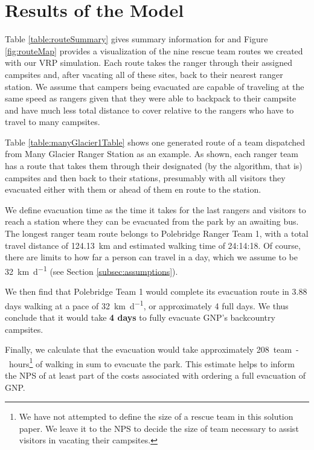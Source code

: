 \documentclass[12pt]{article}
\begin{document}
\section{Results of the Model}

Table \ref{table:routeSummary} gives summary information for and Figure \ref{fig:routeMap} provides a visualization of the nine rescue team routes we created with our VRP simulation. Each route takes the ranger through their assigned campsites and, after vacating all of these sites, back to their nearest ranger station. We assume that campers being evacuated are capable of traveling at the same speed as rangers given that they were able to backpack to their campsite and have much less total distance to cover relative to the rangers who have to travel to many campsites.

Table \ref{table:manyGlacier1Table} shows one generated route of a team dispatched from Many Glacier Ranger Station as an example. As shown, each ranger team has a route that takes them through their designated (by the algorithm, that is) campsites and then back to their stations, presumably with all visitors they evacuated either with them or ahead of them en route to the station. 

We define evacuation time as the time it takes for the last rangers and visitors to reach a station where they can be evacuated from the park by an awaiting bus. The longest ranger team route belongs to Polebridge Ranger Team 1, with a total travel distance of \SI{124.13}{\kilo\meter} and estimated walking time of 24:14:18. Of course, there are limits to how far a person can travel in a day, which we assume to be \SI{32}{\kilo\meter\per\day} (see Section \ref{subsec:assumptions}).

We then find that Polebridge Team 1 would complete its evacuation route in 3.88 days walking at a pace of \SI{32}{\kilo\meter\per\day}, or approximately 4 full days. We thus conclude that it would take \textbf{4 days} to fully evacuate GNP's backcountry campsites.

Finally, we calculate that the evacuation would take approximately \SI{208}{team-hours}\footnote{We have not attempted to define the size of a rescue team in this solution paper. We leave it to the NPS to decide the size of team necessary to assist visitors in vacating their campsites.} of walking in sum to evacuate the park. This estimate helps to inform the NPS of at least part of the costs associated with ordering a full evacuation of GNP.
\end{document}
